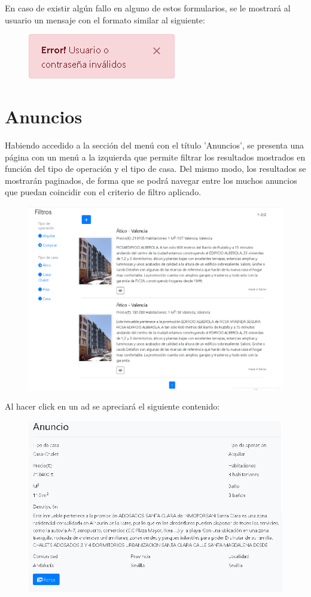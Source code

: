 En caso de existir alg\'{u}n fallo en alguno de estos formularios, se le mostrar\'{a} al usuario un mensaje con el formato similar al siguiente:

\begin{figure}[h!]
\centering
\includegraphics[width=.3\textwidth]{Img/ManualUsuario/ERROR_LOGIN.png}
\end{figure}


\section{Anuncios}
Habiendo accedido a la secci\'{o}n del men\'{u} con el t\'{i}tulo 'Anuncios', se presenta una p\'{a}gina con un men\'{u} a la izquierda que permite filtrar los resultados mostrados en funci\'{o}n del tipo de operaci\'{o}n y el tipo de casa. Del mismo modo, los resultados se mostrar\'{a}n paginados, de forma que se podr\'{a} navegar entre los muchos anuncios que puedan coincidir con el criterio de filtro aplicado.

\begin{figure}[h!]
\centering
\includegraphics[width=.7\textwidth]{Img/ManualUsuario/LISTADO_ANUNCIOS.png}
\end{figure}


Al hacer click en un ad se apreciar\'{a} el siguiente contenido:

\begin{figure}[h!]
\centering
\includegraphics[width=.7\textwidth]{Img/ManualUsuario/ANUNCIO_GUEST.png}
\end{figure}


